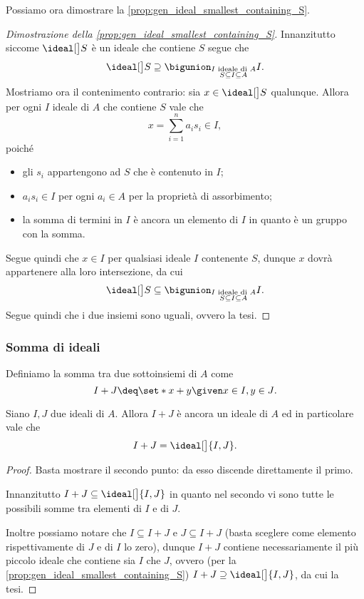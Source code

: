 Possiamo ora dimostrare la \autoref{prop:gen_ideal_smallest_containing_S}.
\begin{proof}
    [Dimostrazione della \autoref{prop:gen_ideal_smallest_containing_S}]
    Innanzitutto siccome $\ideal[\big] S$ è un ideale che contiene $S$ segue che \[
        \ideal[\big] S \supseteq \bigunion_{\substack{I \text{ ideale di }A \\ S \subseteq I \subseteq A}} I. 
    \] Mostriamo ora il contenimento contrario: sia $x \in \ideal[\big] S$ qualunque. Allora per ogni $I$ ideale di $A$ che contiene $S$ vale che \[
        x = \sum_{i = 1}^n a_is_i \in I,
    \] poiché \begin{itemize}
        \item gli $s_i$ appartengono ad $S$ che è contenuto in $I$;
        \item $a_is_i \in I$ per ogni $a_i \in A$ per la proprietà di assorbimento;
        \item la somma di termini in $I$ è ancora un elemento di $I$ in quanto è un gruppo con la somma.
    \end{itemize} Segue quindi che $x \in I$ per qualsiasi ideale $I$ contenente $S$, dunque $x$ dovrà appartenere alla loro intersezione, da cui \[
        \ideal[\big] S \subseteq \bigunion_{\substack{I \text{ ideale di }A \\ S \subseteq I \subseteq A}} I. 
    \] Segue quindi che i due insiemi sono uguali, ovvero la tesi.
\end{proof}

\subsubsection{Somma di ideali}

Definiamo la somma tra due sottoinsiemi di $A$ come \[
    I + J \deq \set*{x + y \given x \in I, y \in J}.    
\]

\begin{proposition}
    Siano $I, J$ due ideali di $A$. Allora $I+J$ è ancora un ideale di $A$ ed in particolare vale che \[
        I + J = \ideal[\big]{I, J}.    
    \]
\end{proposition}
\begin{proof}
    Basta mostrare il secondo punto: da esso discende direttamente il primo.

    Innanzitutto $I + J \subseteq \ideal[\big]{I, J}$ in quanto nel secondo vi sono tutte le possibili somme tra elementi di $I$ e di $J$. 
    
    Inoltre possiamo notare che $I \subseteq I + J$ e $J \subseteq I + J$ (basta sceglere come elemento rispettivamente di $J$ e di $I$ lo zero), dunque $I + J$ contiene necessariamente il più piccolo ideale che contiene sia $I$ che $J$, ovvero (per la \autoref{prop:gen_ideal_smallest_containing_S}) $I+J \supseteq \ideal[\big]{I, J}$, da cui la tesi.
\end{proof}

